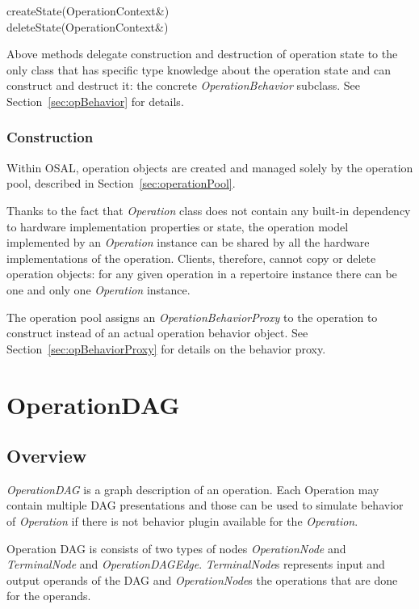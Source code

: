 \documentclass[a4paper,twoside]{tce}
\begin{document}
\begin{description}
\item[createState(OperationContext\&)]%
\item[deleteState(OperationContext\&)]%
\end{description}

Above methods delegate construction and destruction of operation state to
the only class that has specific type knowledge about the operation state
and can construct and destruct it: the concrete \emph{OperationBehavior}
subclass.  See Section~\ref{sec:opBehavior} for details.

\subsubsection{Construction}
\label{ssec:operation-construction}

Within OSAL, operation objects are created and managed solely by the
operation pool, described in Section~\ref{sec:operationPool}.

Thanks to the fact that \emph{Operation} class does not contain any built-in
dependency to hardware implementation properties or state, the operation
model implemented by an \emph{Operation} instance can be shared by all the
hardware implementations of the operation.  Clients, therefore, cannot copy
or delete operation objects: for any given operation in a repertoire
instance there can be one and only one \emph{Operation} instance.

The operation pool assigns an \emph{OperationBehaviorProxy} to the operation
to construct instead of an actual operation behavior object.  See
Section~\ref{sec:opBehaviorProxy} for details on the behavior proxy.

\section{OperationDAG}
\label{sec:operationdag}

\subsection{Overview}

\emph{OperationDAG} is a graph description of an operation. Each Operation
may contain multiple DAG presentations and those can be used to simulate 
behavior of \emph{Operation} if there is not behavior plugin available for the 
\emph{Operation}.

Operation DAG is consists of two types of nodes \emph{OperationNode} and 
\emph{TerminalNode} and \emph{OperationDAGEdge}. \emph{TerminalNode}s
represents input and output operands of the DAG and \emph{OperationNode}s the 
operations that are done for the operands.
\end{document}

